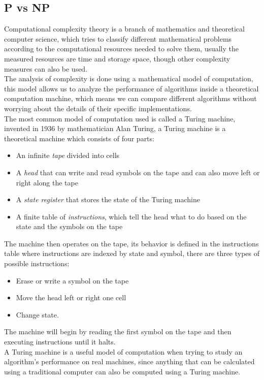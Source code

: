 \subsection{P vs NP}

Computational complexity theory is a branch of mathematics and theoretical computer science, which tries to classify different mathematical problems according to the computational resources needed to solve them, usually the measured resources are time and storage space, though other complexity measures can also be used.
\\The analysis of complexity is done using a mathematical model of computation, this model allows us to analyze the performance of algorithms inside a theoretical computation machine, which means we can compare different algorithms without worrying about the details of their specific implementations.
\\The most common model of computation used is called a Turing machine, invented in 1936 by mathematician Alan Turing, a Turing machine is a theoretical machine which consists of four parts:
\renewcommand\labelitemi{$\textendash$}
\begin{itemize}
	\item An infinite \textit{tape} divided into cells
	\item A \textit{head} that can write and read symbols on the tape and can also move left or right along the tape
	\item A \textit{state register} that stores the state of the Turing machine
	\item A finite table of \textit{instructions}, which tell the head what to do based on the state and the symbols on the tape
\end{itemize}
The machine then operates on the tape, its behavior is defined in the instructions table where instructions are indexed by state and symbol, there are three types of possible instructions:
\renewcommand\labelitemi{$\textendash$}
\begin{itemize}
	\item Erase or write a symbol on the tape
	\item Move the head left or right one cell
	\item Change state. 
\end{itemize}
The machine will begin by reading the first symbol on the tape and then executing instructions until it halts. 
\\A Turing machine is a useful model of computation when trying to study an algorithm's performance on real machines, since anything that can be calculated using a traditional computer can also be computed using a Turing machine.
